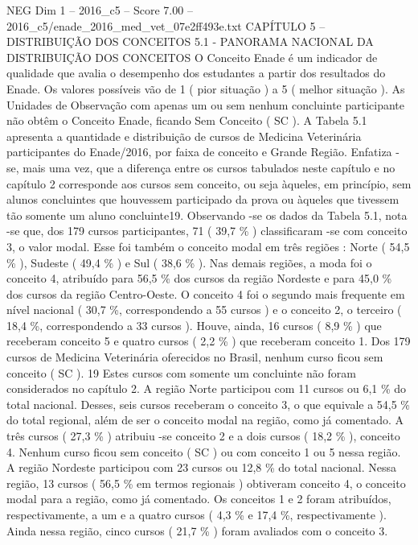 \begin{textsample}{NEG Dim 1 – 2016\_c5 – Score 7.00 – 2016\_c5/enade\_2016\_med\_vet\_07e2ff493e.txt}  \label{ex:f1_neg_362}
CAPÍTULO 5 – DISTRIBUIÇÃO DOS CONCEITOS 5.1 - PANORAMA NACIONAL DA DISTRIBUIÇÃO DOS CONCEITOS O Conceito Enade é um indicador de qualidade que avalia o desempenho dos estudantes a partir dos resultados do Enade.
Os valores possíveis vão de 1 ( pior situação ) a 5 ( melhor situação ).
As Unidades de Observação com apenas um ou sem nenhum concluinte participante não obtêm o Conceito Enade, ficando Sem Conceito ( SC ).
A Tabela 5.1 apresenta a quantidade e distribuição de cursos de Medicina Veterinária participantes do Enade/2016, por faixa de conceito e Grande Região.
Enfatiza -se, mais uma vez, que a diferença entre os cursos tabulados neste capítulo e no capítulo 2 corresponde aos cursos sem conceito, ou seja àqueles, em princípio, sem alunos concluintes que houvessem participado da prova ou àqueles que tivessem tão somente um aluno concluinte19.
Observando -se os dados da Tabela 5.1, nota -se que, dos 179 cursos participantes, 71 ( 39,7 \% ) classificaram -se com conceito 3, o valor modal.
Esse foi também o conceito modal em três regiões : Norte ( 54,5 \% ), Sudeste ( 49,4 \% ) e Sul ( 38,6 \% ).
Nas demais regiões, a moda foi o conceito 4, atribuído para 56,5 \% dos cursos da região Nordeste e para 45,0 \% dos cursos da região Centro-Oeste.
O conceito 4 foi o segundo mais frequente em nível nacional ( 30,7 \%, correspondendo a 55 cursos ) e o conceito 2, o terceiro ( 18,4 \%, correspondendo a 33 cursos ).
Houve, ainda, 16 cursos ( 8,9 \% ) que receberam conceito 5 e quatro cursos ( 2,2 \% ) que receberam conceito 1.
Dos 179 cursos de Medicina Veterinária oferecidos no Brasil, nenhum curso ficou sem conceito ( SC ). 19 Estes cursos com somente um concluinte não foram considerados no capítulo 2.
A região Norte participou com 11 cursos ou 6,1 \% do total nacional.
Desses, seis cursos receberam o conceito 3, o que equivale a 54,5 \% do total regional, além de ser o conceito modal na região, como já comentado.
A três cursos ( 27,3 \% ) atribuiu -se conceito 2 e a dois cursos ( 18,2 \% ), conceito 4.
Nenhum curso ficou sem conceito ( SC ) ou com conceito 1 ou 5 nessa região.
A região Nordeste participou com 23 cursos ou 12,8 \% do total nacional.
Nessa região, 13 cursos ( 56,5 \% em termos regionais ) obtiveram conceito 4, o conceito modal para a região, como já comentado.
Os conceitos 1 e 2 foram atribuídos, respectivamente, a um e a quatro cursos ( 4,3 \% e 17,4 \%, respectivamente ).
Ainda nessa região, cinco cursos ( 21,7 \% ) foram avaliados com o conceito 3.

\end{textsample}
